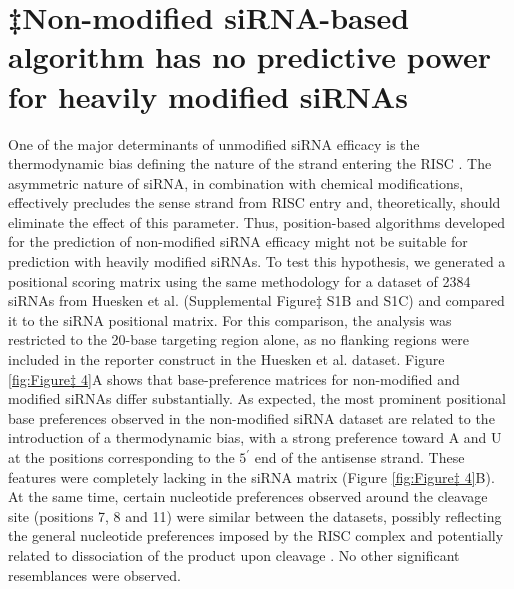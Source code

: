 \documentclass{report}
\begin{document}
\section{‡Non-modified siRNA-based algorithm has no predictive power for heavily modified siRNAs}

One of the major determinants of unmodified siRNA efficacy is the thermodynamic bias defining the nature of the strand entering the RISC \cite{khvorova_functional_2003, matranga_passenger-strand_2005}. The asymmetric nature of siRNA, in combination with chemical modifications, effectively precludes the sense strand from RISC entry and, theoretically, should eliminate the effect of this parameter. Thus, position-based algorithms developed for the prediction of non-modified siRNA efficacy might not be suitable for prediction with heavily modified siRNAs. To test this hypothesis, we generated a positional scoring matrix using the same methodology for a dataset of 2384 siRNAs from Huesken et al. \cite{huesken_design_2005} (Supplemental Figure‡ S1B and S1C) and compared it to the siRNA positional matrix. For this comparison, the analysis was restricted to the 20-base targeting region alone, as no flanking regions were included in the reporter construct in the Huesken et al. dataset. Figure \ref{fig:Figure‡ 4}A shows that base-preference matrices for non-modified and modified siRNAs differ substantially. As expected, the most prominent positional base preferences observed in the non-modified siRNA dataset are related to the introduction of a thermodynamic bias, with a strong preference toward A and U at the positions corresponding to the $5^\prime$ end of the antisense strand. These features were completely lacking in the siRNA matrix (Figure \ref{fig:Figure‡ 4}B). At the same time, certain nucleotide preferences observed around the cleavage site (positions 7, 8 and 11) were similar between the datasets, possibly reflecting the general nucleotide preferences imposed by the RISC complex and potentially related to dissociation of the product upon cleavage \cite{matranga_passenger-strand_2005, zamore_rnai_2000}. No other significant resemblances were observed.
\end{document}

